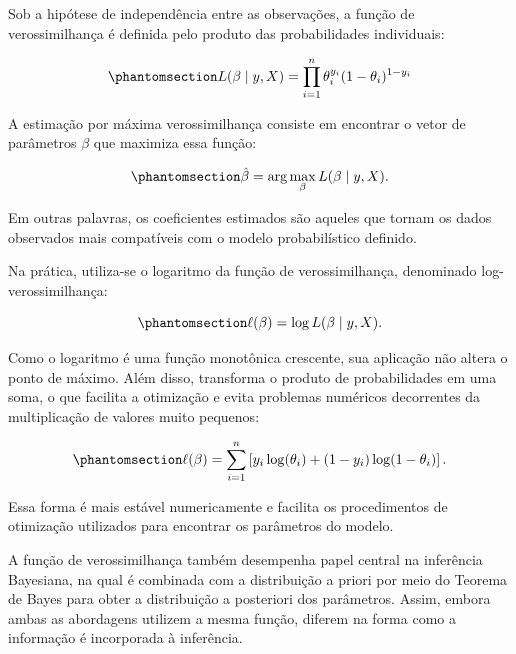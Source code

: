 \documentclass[
  brazilian,
  12pt,
  letterpaper,
  DIV=11,
  numbers=noendperiod]{scrartcl}
\begin{document}
Sob a hipótese de independência entre as observações, a função de
verossimilhança é definida pelo produto das probabilidades individuais:

\begin{equation}\protect\phantomsection\label{eq-verossimilhanca-logistica}{
L(\beta \mid y, X)=\prod_{i=1}^{n}\theta_i^{y_i}(1-\theta_i)^{1-y_i}
}\end{equation}

A estimação por máxima verossimilhança consiste em encontrar o vetor de
parâmetros \(\beta\) que maximiza essa função:

\begin{equation}\protect\phantomsection\label{eq-mle-logistica}{
\hat{\beta} =
\arg\max_{\beta} L(\beta \mid y, X).
}\end{equation}

Em outras palavras, os coeficientes estimados são aqueles que tornam os
dados observados mais compatíveis com o modelo probabilístico definido.

Na prática, utiliza-se o logaritmo da função de verossimilhança,
denominado log-verossimilhança:

\begin{equation}\protect\phantomsection\label{eq-log-verossimilhanca}{
\ell(\beta)=\log L(\beta \mid y, X).
}\end{equation}

Como o logaritmo é uma função monotônica crescente, sua aplicação não
altera o ponto de máximo. Além disso, transforma o produto de
probabilidades em uma soma, o que facilita a otimização e evita
problemas numéricos decorrentes da multiplicação de valores muito
pequenos:

\begin{equation}\protect\phantomsection\label{eq-log-verossimilhanca-expandida}{
\ell(\beta) =
\sum_{i=1}^{n}
\left[
y_i\log(\theta_i)
+
(1-y_i)\log(1-\theta_i)
\right].
}\end{equation}

Essa forma é mais estável numericamente e facilita os procedimentos de
otimização utilizados para encontrar os parâmetros do modelo.

A função de verossimilhança também desempenha papel central na
inferência Bayesiana, na qual é combinada com a distribuição a priori
por meio do Teorema de Bayes para obter a distribuição a posteriori dos
parâmetros. Assim, embora ambas as abordagens utilizem a mesma função,
diferem na forma como a informação é incorporada à inferência.
\end{document}

